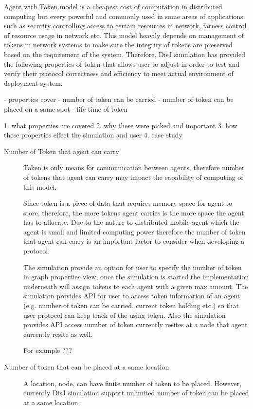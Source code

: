 \begin{description}
\begin{description}
Agent with Token model is a cheapest cost of computation in distributed computing but every powerful and commonly used in some areas of applications such as security controlling access to certain resources in network, farness control of resource usage in network etc. This model heavily depends on management of tokens in network systems to make sure the integrity of tokens are preserved based on the requirement of the system. Therefore, DisJ simulation has provided the following properties of token that allows user to adjust in order to test and verify their protocol correctness and efficiency to meet actual environment of deployment system.

- properties cover
	- number of token can be carried
	- number of token can be placed on a same spot
	- life time of token

1. what properties are covered
2. why these were picked and important
3. how these properties effect the simulation and user
4. case study

\begin{description}
\item[Number of Token that agent can carry]
Token is only means for communication between agents, therefore number of tokens that agent can carry may impact the capability of computing of this model.

Since token is a piece of data that requires memory space for agent to store, therefore, the more tokens agent carries is the more space the agent has to allocate. Due to the nature to distributed mobile agent which the agent is small and limited computing power therefore the number of token that agent can carry is an important factor to consider when developing a protocol.

The simulation provide an option for user to specify the number of token in graph properties view, once the simulation is started the implementation underneath will assign tokens to each agent with a given max amount. The simulation provides API for user to access token information of an agent (e.g. number of token can be carried, current token holding etc.) so that user protocol can keep track of the using token. Also the simulation provides API access number of token currently resites at a node that agent currently resite as well.

For example ???

\item[Number of token that can be placed at a same location]
A location, node, can have finite number of token to be placed. However, currently DisJ simulation support unlimited number of token can be placed at a same location.


\end{description}
\end{description}
\end{description}
